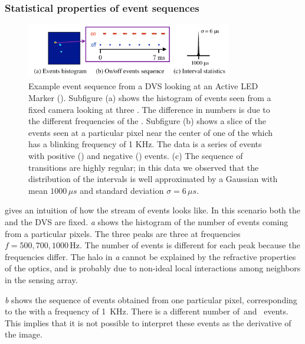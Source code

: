 \subsubsection{Statistical properties of event sequences}

\begin{figure}[b]
\begin{centering}
\includegraphics[width=9cm]{figures/slides/event_sequence2}
\par\end{centering}

\caption{\label{fig:events-hist}Example event sequence from a DVS looking
at an Active LED Marker (\ALM). Subfigure (a) shows the histogram
of events seen from a fixed camera looking at three \ALMs. The difference
in numbers is due to the different frequencies of the \ALMs. Subfigure
(b) shows a slice of the events seen at a particular pixel near the
center of one of the \ALMs which has a blinking frequency of 1 KHz.
The data is a series of events with positive (\pP) and negative (\pN)
events. (c) The sequence of \pPN transitions are highly regular;
in this data we observed that the distribution of the intervals is
well approximated by a Gaussian with mean $1000\,\mu s$ and standard
deviation $\sigma=6\,\mu s$. }
\end{figure}


 gives an intuition of how the stream
of events looks like. In this scenario both the \ALMs and the DVS
are fixed. \emph{a} shows the histogram
of the number of events coming from a particular pixels. The three
peaks are three \ALMs at frequencies $f=500,700,1000\,\mbox{Hz}$.
The number of events is different for each peak because the frequencies
differ. The halo in \emph{a} cannot be
explained by the refractive properties of the optics, and is probably
due to non-ideal local interactions among neighbors in the sensing
array.

\emph{b} shows the sequence of events
obtained from one particular pixel, corresponding to the \ALM  with
a frequency of 1~KHz. There is a different number of~\pP and~\pN
events. This implies that it is not possible to interpret these events
as the derivative of the image.

